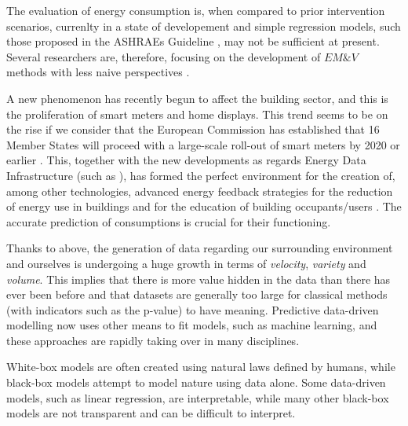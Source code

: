 \documentclass[10pt, conference, compsocconf]{IEEEtran}
\begin{document}
The evaluation of energy consumption is, when compared to prior intervention scenarios, currenlty in a state of developement and  simple regression models, such those proposed in the ASHRAEs Guideline \cite{ashrae2002ashrae}, may not be sufficient at present. Several researchers are, therefore, focusing on the development of $EM\&V$  methods with less naive perspectives \cite{ramalloidentifying}. 


A new phenomenon has recently begun to affect the building sector, and this is the proliferation of smart meters and home displays. This trend seems to be on the rise if we consider that the European Commission has established that 16 Member States will proceed with a large-scale roll-out of smart meters by 2020 or earlier \cite{ec2014report}. This, together with the new developments as regards Energy Data Infrastructure (such as \cite{terroso2017open, fotopoulou2017providing, moreno2017applicability}), has formed the perfect environment for the creation of, among other technologies, advanced energy feedback strategies for the reduction of energy use in buildings and for the education of building occupants/users \cite{how2017}. The accurate prediction of consumptions is crucial for their functioning.

Thanks to above, the generation of data regarding our surrounding environment and ourselves is undergoing a huge growth in terms of \emph{velocity}, \emph{variety} and \emph{volume}. This implies that there is more value hidden in the data than there has ever been before and that datasets are generally too large for classical methods (with indicators such as the p-value) to have meaning. Predictive data-driven modelling now uses other means to fit models, such as machine learning, and these approaches are rapidly taking over in many disciplines.



White-box models are often created using natural laws defined by humans, while black-box models attempt to model nature using data alone. Some data-driven models, such as linear regression, are interpretable, while many other black-box models are not transparent and can be difficult to interpret.
\end{document}
